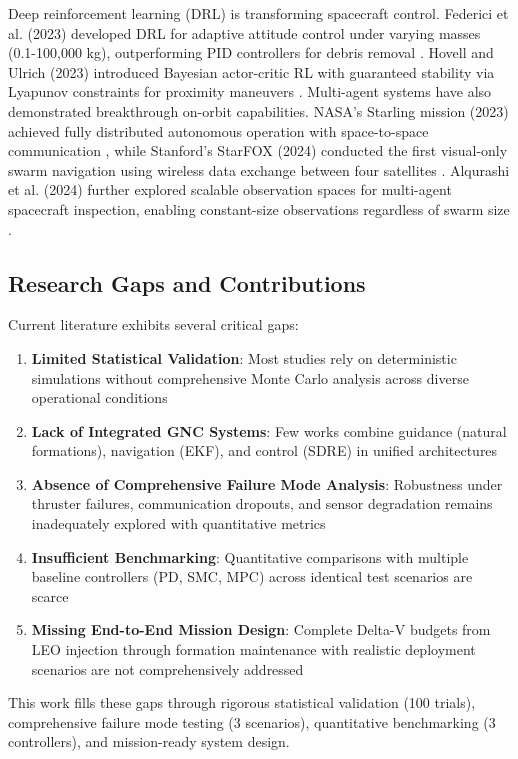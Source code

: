 \documentclass[10pt,letterpaper]{article}
\begin{document}
Deep reinforcement learning (DRL) is transforming spacecraft control. Federici et al. (2023) developed DRL for adaptive attitude control under varying masses (0.1-100,000 kg), outperforming PID controllers for debris removal \cite{federici2023drl}. Hovell and Ulrich (2023) introduced Bayesian actor-critic RL with guaranteed stability via Lyapunov constraints for proximity maneuvers \cite{hovell2023bayesian}. Multi-agent systems have also demonstrated breakthrough on-orbit capabilities. NASA's Starling mission (2023) achieved fully distributed autonomous operation with space-to-space communication \cite{kramer2023starling}, while Stanford's StarFOX (2024) conducted the first visual-only swarm navigation using wireless data exchange between four satellites \cite{stanford2024starfox}. Alqurashi et al. (2024) further explored scalable observation spaces for multi-agent spacecraft inspection, enabling constant-size observations regardless of swarm size \cite{alqurashi2024scalable}.

\subsection{Research Gaps and Contributions}

Current literature exhibits several critical gaps:
\begin{enumerate}
    \item \textbf{Limited Statistical Validation}: Most studies rely on deterministic simulations without comprehensive Monte Carlo analysis across diverse operational conditions
    \item \textbf{Lack of Integrated GNC Systems}: Few works combine guidance (natural formations), navigation (EKF), and control (SDRE) in unified architectures
    \item \textbf{Absence of Comprehensive Failure Mode Analysis}: Robustness under thruster failures, communication dropouts, and sensor degradation remains inadequately explored with quantitative metrics
    \item \textbf{Insufficient Benchmarking}: Quantitative comparisons with multiple baseline controllers (PD, SMC, MPC) across identical test scenarios are scarce
    \item \textbf{Missing End-to-End Mission Design}: Complete Delta-V budgets from LEO injection through formation maintenance with realistic deployment scenarios are not comprehensively addressed
\end{enumerate}

This work fills these gaps through rigorous statistical validation (100 trials), comprehensive failure mode testing (3 scenarios), quantitative benchmarking (3 controllers), and mission-ready system design.
\end{document}
